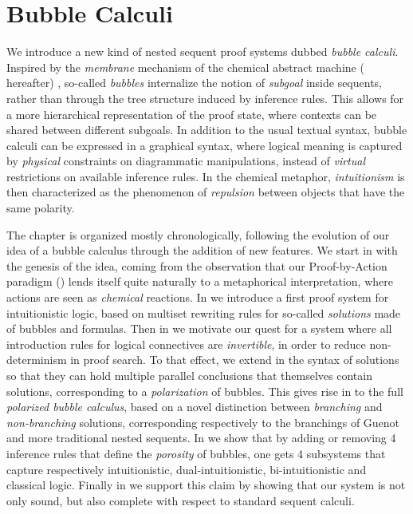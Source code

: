 \setchapterpreamble[u]{\margintoc}
\chapter{Bubble Calculi}

We introduce a new kind of nested sequent proof systems dubbed \emph{bubble
calculi}. Inspired by the \emph{membrane} mechanism of the chemical abstract
machine ({\cham} hereafter) , so-called
\emph{bubbles} internalize the notion of \emph{subgoal} inside sequents, rather
than through the tree structure induced by inference rules. This allows for a
more hierarchical representation of the proof state, where contexts can be
shared between different subgoals. In addition to the usual textual syntax,
bubble calculi can be expressed in a graphical syntax, where logical meaning is
captured by \emph{physical} constraints on diagrammatic manipulations, instead
of \emph{virtual} restrictions on available inference rules. In the chemical
metaphor, \emph{intuitionism} is then characterized as the phenomenon of
\emph{repulsion} between objects that have the same polarity.

The chapter is organized mostly chronologically, following the evolution of our
idea of a bubble calculus through the addition of new features. We start in
 with the genesis of the idea, coming from the observation that
our Proof-by-Action paradigm () lends itself quite naturally to a
metaphorical interpretation, where actions are seen as \emph{chemical}
reactions. In  we introduce a first proof system for
intuitionistic logic, based on multiset rewriting rules for so-called
\emph{solutions} made of bubbles and formulas. Then in 
we motivate our quest for a system where all introduction rules for logical
connectives are \emph{invertible}, in order to reduce non-determinism in proof
search. To that effect, we extend in  the syntax of solutions so
that they can hold multiple parallel conclusions that themselves contain
solutions, corresponding to a \emph{polarization} of bubbles. This gives rise in
 to the full \emph{polarized bubble calculus}, based
on a novel distinction between \emph{branching} and \emph{non-branching}
solutions, corresponding respectively to the branchings of Guenot
 and more traditional nested sequents. In
 we show that by adding or removing 4 inference rules
that define the \emph{porosity} of bubbles, one gets 4 subsystems that capture
respectively intuitionistic, dual-intuitionistic, bi-intuitionistic and
classical logic. Finally in  we support this claim
by showing that our system is not only sound, but also complete with respect to
standard sequent calculi.


